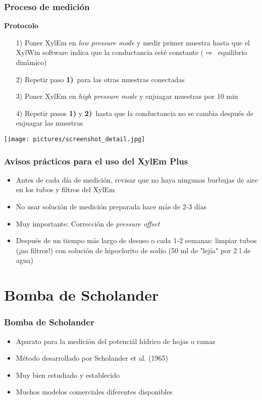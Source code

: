 \documentclass[usepdftitle=false]{beamer}
\newcommand{\blue}[1]{{\color{blue!50!black}#1}}
\newcommand{\Blue}[1]{{\color{blue!50!black}\textbf{#1}}}
\newcommand{\Rar}{$\Rightarrow$}
\newcommand{\tw}{\textwidth}
\begin{document}
\begin{frame}
	\frametitle{Proceso de medición} 
	\textbf{Protocolo}
		\begin{itemize}[<+->]
			\item[\blue{1)}] Poner XylEm en \textit{low pressure mode} y medir primer muestra hasta que el XylWin software indica que la conductancia esté constante \alert<1>{(\Rar\ equilibrio dinámico)}
			\item[\blue{2)}] Repetir paso \Blue{1)}\ para las otras muestras conectadas
			\item[\blue{3)}] Poner XylEm en \textit{high pressure mode} y enjuagar muestras por 10 min
			\item[\blue{4)}]Repetir pasos \Blue{1)} y \Blue{2)}\ hasta que la conductancia no se cambia después de enjuagar las muestras
		\end{itemize}	
		\texttt{[image: pictures/screenshot\_detail.jpg]}
\end{frame}


\begin{frame}
	\frametitle{Avisos prácticos para el uso del XylEm Plus}
	\begin{itemize}[<+- |alert@+>]
		\item Antes de cada día de medición, revisar que no haya ningunas burbujas de aire en los tubos y filtros del XylEm 	
		\item No usar solución de medición preparada hace más de 2-3 días	
		\item Muy importante: Corrección de \textit{pressure offset}
		\item Después de un tiempo más largo de desuso o cada 1-2 semanas: limpiar tubos (¡no filtros!) con solución de hipoclorito de sodio (50 ml de "lejía" por 2 l de agua)	
	\end{itemize}		
\end{frame}



\section{Bomba de Scholander}
\begin{frame}
		\frametitle{Bomba de Scholander}
 \begin{itemize}
 	\item Aparato para la medición del \alert{potenciál hídrico} de hojas o ramas
 	\item Método desarrollado por \alert{Scholander et al. (1965)}
 	\item Muy bien estudiado y establecido
 	\item Muchos modelos comerciales diferentes disponibles  \end{itemize}	    
\end{frame}
\end{document}
